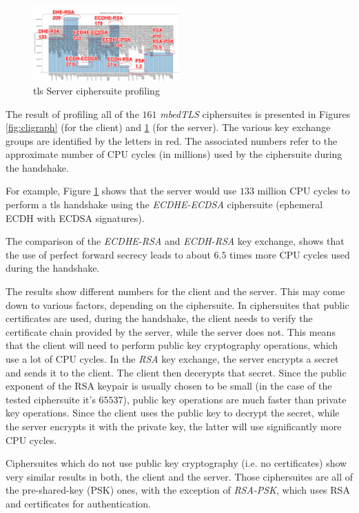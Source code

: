 \documentclass[conference]{IEEEtran}
\begin{document}
\begin{figure}
        \centering
        \includegraphics[width=0.5\textwidth]{./srv-graph.png} %
        \caption{\label{fig:srvgraph} \gls{tls} Server ciphersuite profiling}
\end{figure}

The result of profiling
all of the $161$ \textit{mbedTLS} ciphersuites is presented in Figures
\ref{fig:cligraph} (for the client) and \ref{fig:srvgraph} (for the server). The various key exchange groups are identified by the letters
in red. The associated numbers refer to the approximate number of CPU
cycles (in millions) used by the ciphersuite during the handshake.

For example, Figure \ref{fig:srvgraph} shows that the server would use
$133$ million CPU cycles to perform a \gls{tls} handshake using the
\textit{ECDHE-ECDSA} ciphersuite (ephemeral ECDH with ECDSA signatures).

The comparison of the \textit{ECDHE-RSA} and \textit{ECDH-RSA}
key exchange, shows that the use of perfect forward secrecy leads to
about $6.5$ times more CPU cycles used during the handshake.

The results show different numbers for the client and the server.
This may come down to various factors, depending on the ciphersuite. In ciphersuites
that public certificates are used, during the handshake, the client needs
to verify the certificate chain provided by the server, while the
server does not. This means that the client will need to perform
public key cryptography operations, which use a lot of CPU cycles.
In the \textit{RSA} key exchange, the server encrypts a secret
and sends it to the client. The client then decerypts that secret.
Since the public exponent of the RSA keypair is usually chosen to be small (in the
case of the tested ciphersuite it's $65537$), public key operations
are much faster than private key operations. Since the client uses
the public key to decrypt the secret, while the server encrypts it
with the private key, the latter will use significantly more CPU
cycles.

Ciphersuites which do not use public key cryptography (i.e. no
certificates) show very similar results in both, the client and the server. Those ciphersuites are all of the pre-shared-key (PSK) ones, with
the exception of \textit{RSA-PSK}, which uses RSA and certificates
for authentication.
\end{document}

